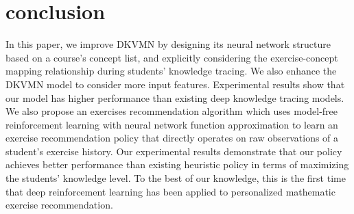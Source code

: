 \documentclass{edm_template}
\begin{document}


\section{conclusion}

In this paper, we improve DKVMN by designing its neural network structure based on a course's concept list, and explicitly considering the exercise-concept mapping relationship during students' knowledge tracing. We also enhance the DKVMN model to consider more input features. Experimental results show that our model has higher performance than existing deep knowledge tracing models. We also propose an exercises recommendation algorithm which uses model-free reinforcement learning with neural network function approximation to learn an exercise recommendation policy that directly operates on raw observations of a student's exercise history.
Our experimental results demonstrate that our policy achieves better performance than existing heuristic policy in terms of maximizing the students' knowledge level. To the best of our knowledge, this is the first time that deep reinforcement learning has been applied to personalized mathematic exercise recommendation.
\end{document}
